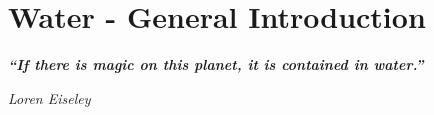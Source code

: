 %
%
%
%
%


\chapter{Water - General Introduction}

\vspace{0.2cm}
\begin{center}
\textbf{\textit{“If there is magic on this planet, it is contained in water.”}}
\end{center}
\begin{flushright}
\textit{Loren Eiseley}
\end{flushright}
\vspace{0.2cm}



